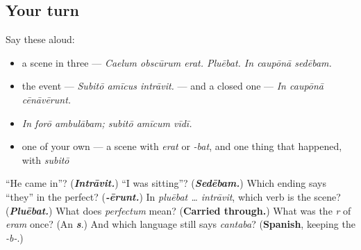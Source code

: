 \subsection*{Your turn}
Say these aloud:

\begin{itemize}
\raggedright
  \item a scene in three — \emph{Caelum obscūrum erat. Pluēbat. In caupōnā sedēbam.}
  \item the event — \emph{Subitō amīcus intrāvit.} — and a closed one — \emph{In caupōnā cēnāvērunt.}
  \item \emph{In forō ambulābam; subitō amīcum vīdī.}
  \item one of your own — a scene with \emph{erat} or \emph{-bat}, and one thing that happened, with \emph{subitō}
\end{itemize}

\begin{tcolorbox}[breakable,colback=teal!4,colframe=teal!35!black,title={Before you move on}]
\textquotedblleft{}He came in\textquotedblright{}? (\emph{\textbf{Intrāvit.}}) \textquotedblleft{}I was sitting\textquotedblright{}? (\emph{\textbf{Sedēbam.}}) Which ending says \textquotedblleft{}they\textquotedblright{} in the perfect? (\emph{\textbf{-ērunt.}}) In \emph{pluēbat … intrāvit}, which verb is the scene? (\emph{\textbf{Pluēbat.}}) What does \emph{perfectum} mean? (\textbf{Carried through.}) What was the \emph{r} of \emph{eram} once? (An \emph{\textbf{s}}.) And which language still says \emph{cantaba}? (\textbf{Spanish}, keeping the \emph{-b-}.)
\end{tcolorbox}
